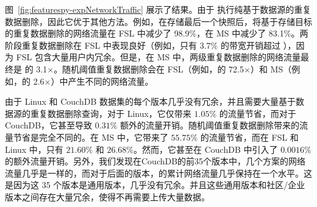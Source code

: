 图~\ref{fig:featurespy-expNetworkTraffic} 展示了结果。由于 \prototype 执行纯基于数据源的重复数据删除，因此它优于其他方法。例如，在存储最后一个快照后，\prototype 将基于存储目标的重复数据删除的网络流量在 FSL 中减少了 98.9\%，在 MS 中减少了 83.1\%。两阶段重复数据删除在 ​​FSL 中表现良好（例如，只有 3.7\% 的带宽开销超过 \prototype），因为 FSL 包含大量用户内冗余。但是，在 MS 中，两级重复数据删除的网络流量最终是 \prototype 的 3.1$\times$。随机阈值重复数据删除会在 FSL（例如，\prototype 的 72.5$\times$）和 MS（例如，\prototype 的 2.6$\times$）中产生不同的网络流量。

由于 Linux 和 CouchDB 数据集的每个版本几乎没有冗余，并且需要大量基于数据源的重复数据删除查询，对于 Linux，它仅带来 $1.05\%$ 的流量节省，而对于 CouchDB，它甚至导致 $0.31 \%$ 额外的流量开销。随机阈值重复数据删除带来的流量节省是完全不同的。在 MS 中，它带来了 $55.75\%$ 的流量节省，而在 FSL 和 Linux 中，只有 $21.60\%$ 和 $26.68\%$。然而，它甚至在 CouchDB 中引入了 $0.0016\%$ 的额外流量开销。另外，我们发现在CouchDB的前35个版本中，几个方案的网络流量几乎是一样的，而对于后面的版本，\prototype 的累计网络流量几乎保持在一个水平。这是因为这 35 个版本是通用版本，几乎没有冗余。并且这些通用版本和社区/企业版本之间存在大量冗余，使得\prototype 不再需要上传大量数据。